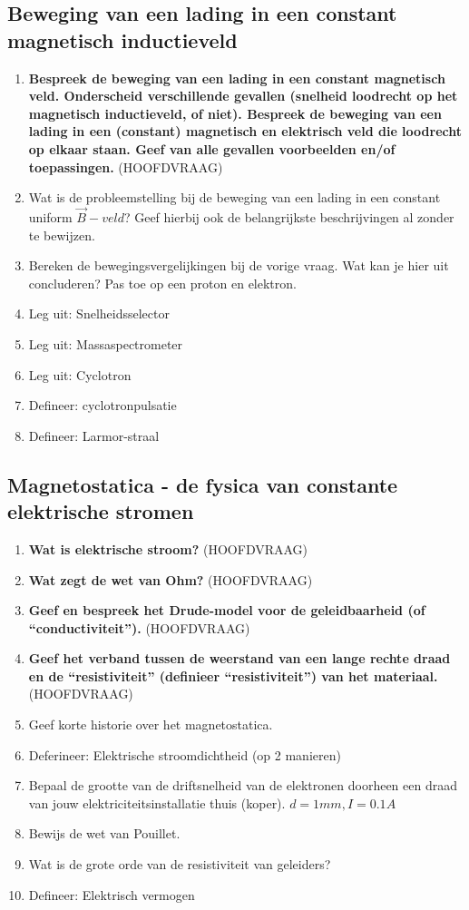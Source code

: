 \documentclass[a4paper,12pt]{article}
\begin{document}
    \subsection{Beweging van een lading in een constant magnetisch inductieveld}
    \begin{enumerate}
        \item \textbf{Bespreek de beweging van een lading in een constant magnetisch veld. Onderscheid verschillende gevallen (snelheid loodrecht op het magnetisch inductieveld, of niet). Bespreek de beweging van een lading in een (constant) magnetisch en elektrisch veld die loodrecht op elkaar staan. Geef van alle gevallen voorbeelden en/of toepassingen.} (HOOFDVRAAG)
        \item Wat is de probleemstelling bij de beweging van een lading in een constant uniform $\vec{B}-veld$? Geef hierbij ook de belangrijkste beschrijvingen al zonder te bewijzen.
        \item Bereken de bewegingsvergelijkingen bij de vorige vraag. Wat kan je hier uit concluderen? Pas toe op een proton en elektron.
        \item Leg uit: Snelheidsselector
        \item Leg uit: Massaspectrometer
        \item Leg uit: Cyclotron
        \item Defineer: cyclotronpulsatie
        \item Defineer: Larmor-straal
    \end{enumerate}
    \subsection{Magnetostatica - de fysica van constante elektrische stromen}
    \begin{enumerate}
        \item \textbf{Wat is elektrische stroom?} (HOOFDVRAAG)
        \item \textbf{Wat zegt de wet van Ohm?} (HOOFDVRAAG)
        \item \textbf{Geef en bespreek het Drude-model voor de geleidbaarheid (of “conductiviteit”).} (HOOFDVRAAG)
        \item \textbf{Geef het verband tussen de weerstand van een lange rechte draad en de “resistiviteit” (definieer “resistiviteit”) van het materiaal.} (HOOFDVRAAG)
        \item Geef korte historie over het magnetostatica.
        \item Deferineer: Elektrische stroomdichtheid (op 2 manieren)
        \item Bepaal de grootte van de driftsnelheid van de elektronen doorheen een draad van jouw elektriciteitsinstallatie thuis (koper). $d=1mm, I=0.1A$
        \item Bewijs de wet van Pouillet.
        \item Wat is de grote orde van de resistiviteit van geleiders?
        \item Defineer: Elektrisch vermogen
    \end{enumerate}
\end{document}
